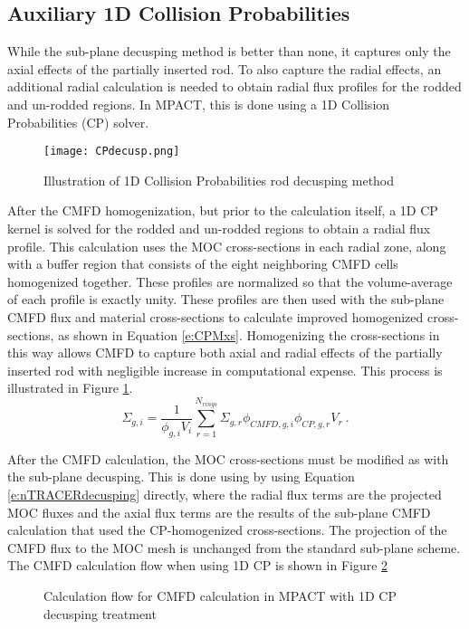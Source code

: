 \subsection{Auxiliary 1D Collision Probabilities}

While the sub-plane decusping method is better than none, it captures only the axial effects of the partially inserted rod.  To also capture the radial effects, an additional radial calculation is needed to obtain radial flux profiles for the rodded and un-rodded regions.  In MPACT, this is done using a 1D Collision Probabilities (CP) solver.

\begin{figure}[h]
  \centering
  \texttt{[image: CPdecusp.png]}
  \caption[Collision Probabilities Decusping]{Illustration of 1D Collision Probabilities rod decusping method}\label{f:CPdecusp}
\end{figure}

After the CMFD homogenization, but prior to the calculation itself, a 1D CP kernel is solved for the rodded and un-rodded regions to obtain a radial flux profile.  This calculation uses the MOC cross-sections in each radial zone, along with a buffer region that consists of the eight neighboring CMFD cells homogenized together.  These profiles are normalized so that the volume-average of each profile is exactly unity.  These profiles are then used with the sub-plane CMFD flux and material cross-sections to calculate improved homogenized cross-sections, as shown in Equation \ref{e:CPMxs}.  Homogenizing the cross-sections in this way allows CMFD to capture both axial and radial effects of the partially inserted rod with negligible increase in computational expense.  This process is illustrated in Figure \ref{f:CPdecusp}.
\begin{equation}\label{e:CPMxs}
\Sigma_{g,i}=\frac{1}{\phi_{g,i}V_i}\sum_{r=1}^{N_{rings}} \Sigma_{g,r} \phi_{CMFD,g,i} \phi_{CP,g,r} V_r\ .
\end{equation}

After the CMFD calculation, the MOC cross-sections must be modified as with the sub-plane decusping.  This is done using by using Equation \ref{e:nTRACERdecusping} directly, where the radial flux terms are the projected MOC fluxes and the axial flux terms are the results of the sub-plane CMFD calculation that used the CP-homogenized cross-sections.  The projection of the CMFD flux to the MOC mesh is unchanged from the standard sub-plane scheme.  The CMFD calculation flow when using 1D CP is shown in Figure \ref{f:1dcpm-flowchart}

\begin{figure}
  \centering
  
  \caption[Stuff]{Calculation flow for CMFD calculation in MPACT with 1D CP decusping treatment}\label{f:1dcpm-flowchart}
\end{figure}